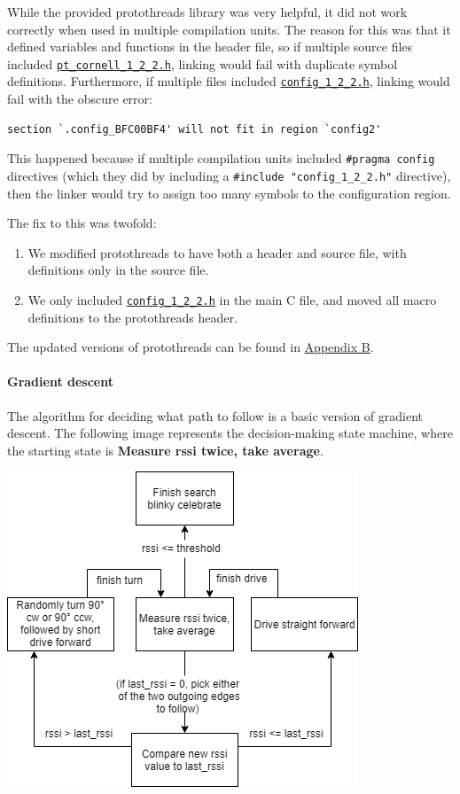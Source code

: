 \documentclass[]{article}
\providecommand{\tightlist}{%
  \setlength{\itemsep}{0pt}\setlength{\parskip}{0pt}}
\let\oldparagraph\paragraph
\renewcommand{\paragraph}[1]{\oldparagraph{#1}\mbox{}}
\begin{document}
While the provided protothreads library was very helpful, it did not
work correctly when used in multiple compilation units. The reason for
this was that it defined variables and functions in the header file, so
if multiple source files included
\href{generated/pt_cornell_1_2_2.h.html}{\texttt{pt\_cornell\_1\_2\_2.h}},
linking would fail with duplicate symbol definitions. Furthermore, if
multiple files included
\href{generated/config_1_2_2.h.html}{\texttt{config\_1\_2\_2.h}},
linking would fail with the obscure error:

\begin{verbatim}
section `.config_BFC00BF4' will not fit in region `config2'
\end{verbatim}

This happened because if multiple compilation units included
\texttt{\#pragma\ config} directives (which they did by including a
\texttt{\#include\ "config\_1\_2\_2.h"} directive), then the linker
would try to assign too many symbols to the configuration region.

The fix to this was twofold:

\begin{enumerate}
\def\labelenumi{\arabic{enumi}.}
\tightlist
\item
  We modified protothreads to have both a header and source file, with
  definitions only in the source file.
\item
  We only included
  \href{generated/config_1_2_2.h.html}{\texttt{config\_1\_2\_2.h}} in
  the main C file, and moved all macro definitions to the protothreads
  header.
\end{enumerate}

The updated versions of protothreads can be found in
\protect\hyperlink{appendix-b-source-listing}{Appendix B}.

\hypertarget{gradient-descent}{%
\paragraph{Gradient descent}\label{gradient-descent}}

The algorithm for deciding what path to follow is a basic version of
gradient descent. The following image represents the decision-making
state machine, where the starting state is \textbf{Measure rssi twice,
take average}.

\includegraphics{grad_desc.png}
\end{document}

